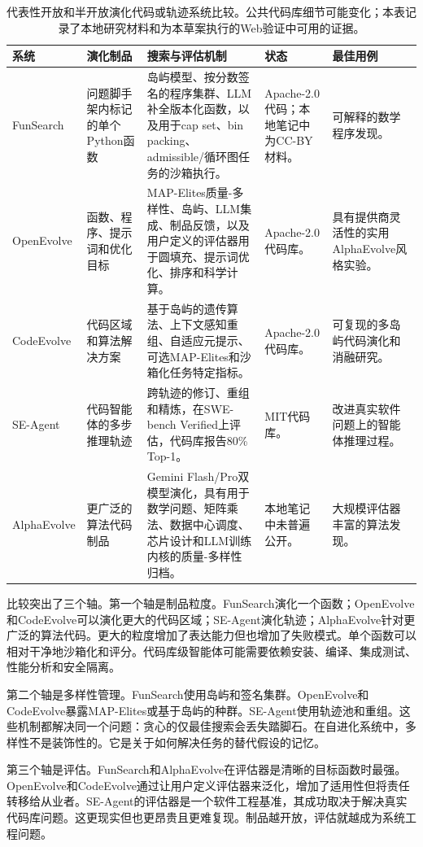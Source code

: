 \begin{table}[t]
\centering
\caption{代表性开放和半开放演化代码或轨迹系统比较。公共代码库细节可能变化；本表记录了本地研究材料和为本草案执行的Web验证中可用的证据。}
\label{tab:open-source-evolution-systems}
{\TableTight
\begin{tabularx}{\textwidth}{@{}L{0.12\textwidth}L{0.18\textwidth}L{0.34\textwidth}L{0.14\textwidth}Y@{}}
\toprule
\textbf{系统} & \textbf{演化制品} & \textbf{搜索与评估机制} & \textbf{状态} & \textbf{最佳用例} \\
\midrule
FunSearch & 问题脚手架内标记的单个Python函数 & 岛屿模型、按分数签名的程序集群、LLM补全版本化函数，以及用于cap set、bin packing、admissible/循环图任务的沙箱执行。 & Apache-2.0代码；本地笔记中为CC-BY材料。 & 可解释的数学程序发现。 \\
OpenEvolve & 函数、程序、提示词和优化目标 & MAP-Elites质量-多样性、岛屿、LLM集成、制品反馈，以及用户定义的评估器用于圆填充、提示词优化、排序和科学计算。 & Apache-2.0代码库。 & 具有提供商灵活性的实用AlphaEvolve风格实验。 \\
CodeEvolve & 代码区域和算法解决方案 & 基于岛屿的遗传算法、上下文感知重组、自适应元提示、可选MAP-Elites和沙箱化任务特定指标。 & Apache-2.0代码库。 & 可复现的多岛屿代码演化和消融研究。 \\
SE-Agent & 代码智能体的多步推理轨迹 & 跨轨迹的修订、重组和精炼，在SWE-bench Verified上评估，代码库报告80\% Top-1。 & MIT代码库。 & 改进真实软件问题上的智能体推理过程。 \\
AlphaEvolve & 更广泛的算法代码制品 & Gemini Flash/Pro双模型演化，具有用于数学问题、矩阵乘法、数据中心调度、芯片设计和LLM训练内核的质量-多样性归档。 & 本地笔记中未普遍公开。 & 大规模评估器丰富的算法发现。 \\
\bottomrule
\end{tabularx}}
\end{table}

比较突出了三个轴。第一个轴是制品粒度。FunSearch演化一个函数；OpenEvolve和CodeEvolve可以演化更大的代码区域；SE-Agent演化轨迹；AlphaEvolve针对更广泛的算法代码。更大的粒度增加了表达能力但也增加了失败模式。单个函数可以相对干净地沙箱化和评分。代码库级智能体可能需要依赖安装、编译、集成测试、性能分析和安全隔离。

第二个轴是多样性管理。FunSearch使用岛屿和签名集群。OpenEvolve和CodeEvolve暴露MAP-Elites或基于岛屿的种群。SE-Agent使用轨迹池和重组。这些机制都解决同一个问题：贪心的仅最佳搜索会丢失踏脚石。在自进化系统中，多样性不是装饰性的。它是关于如何解决任务的替代假设的记忆。

第三个轴是评估。FunSearch和AlphaEvolve在评估器是清晰的目标函数时最强。OpenEvolve和CodeEvolve通过让用户定义评估器来泛化，增加了适用性但将责任转移给从业者。SE-Agent的评估器是一个软件工程基准，其成功取决于解决真实代码库问题。这更现实但也更昂贵且更难复现。制品越开放，评估就越成为系统工程问题。

